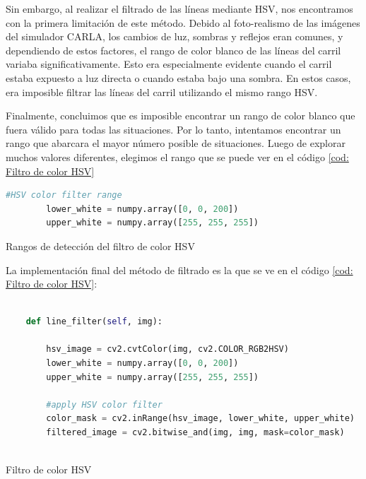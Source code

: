 \bigskip

Sin embargo, al realizar el filtrado de las líneas mediante HSV, nos encontramos con la primera limitación de este método. Debido al foto-realismo de las imágenes del simulador CARLA, los cambios de luz, sombras y reflejos eran comunes, y dependiendo de estos factores, el rango de color blanco de las líneas del carril variaba significativamente. Esto era especialmente evidente cuando el carril estaba expuesto a luz directa o cuando estaba bajo una sombra. En estos casos, era imposible filtrar las líneas del carril utilizando el mismo rango HSV.

\bigskip

Finalmente, concluimos que es imposible encontrar un rango de color blanco que fuera válido para todas las situaciones. Por lo tanto, intentamos encontrar un rango que abarcara el mayor número posible de situaciones. Luego de explorar muchos valores diferentes, elegimos el rango que se puede ver en el código \ref{cod: Filtro de color HSV}


\begin{code}[H]
	\begin{lstlisting}[language=Python]
        #HSV color filter range
        lower_white = numpy.array([0, 0, 200])
        upper_white = numpy.array([255, 255, 255])
	\end{lstlisting}
\caption[Rangos de detección del filtro de color HSV ]{ Rangos de detección del filtro de color HSV}
\label{cod: Rangos HSV}
\end{code}


 La implementación final del método de filtrado es la que se ve en el código \ref{cod: Filtro de color HSV}:

\begin{code}[H]
	\begin{lstlisting}[language=Python]
	
    def line_filter(self, img):

        hsv_image = cv2.cvtColor(img, cv2.COLOR_RGB2HSV)
        lower_white = numpy.array([0, 0, 200])
        upper_white = numpy.array([255, 255, 255])
	
        #apply HSV color filter
        color_mask = cv2.inRange(hsv_image, lower_white, upper_white)
        filtered_image = cv2.bitwise_and(img, img, mask=color_mask)
        
	\end{lstlisting}
\caption[Filtro de color HSVl ]{Filtro de color HSV}
\label{cod: Filtro de color HSV}
\end{code}

